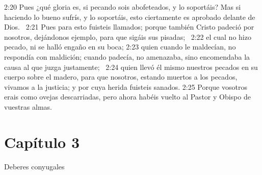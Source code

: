 2:20 Pues ¿qué gloria es, si pecando sois abofeteados, y lo soportáis? Mas si haciendo lo bueno sufrís, y lo soportáis, esto ciertamente es aprobado delante de Dios.  
2:21 Pues para esto fuisteis llamados; porque también Cristo padeció por nosotros, dejándonos ejemplo, para que sigáis sus pisadas;  
2:22 el cual no hizo pecado, ni se halló engaño en su boca; 
2:23 quien cuando le maldecían, no respondía con maldición; cuando padecía, no amenazaba, sino encomendaba la causa al que juzga justamente;  
2:24 quien llevó él mismo nuestros pecados en su cuerpo sobre el madero, para que nosotros, estando muertos a los pecados, vivamos a la justicia; y por cuya herida fuisteis sanados. 
2:25 Porque vosotros erais como ovejas descarriadas, pero ahora habéis vuelto al Pastor y Obispo de vuestras almas. 
\section*{Capítulo 3 }
Deberes conyugales  

